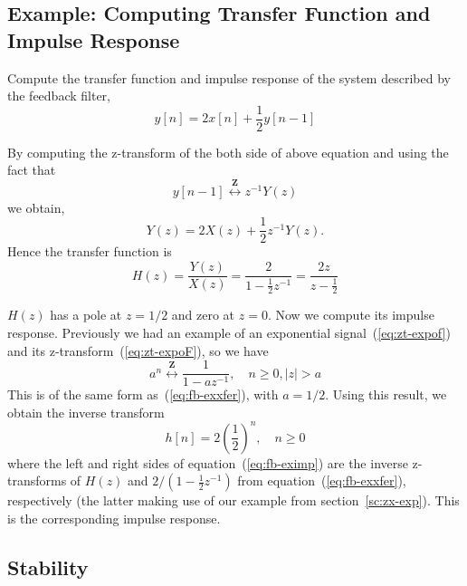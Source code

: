 \subsection{Example: Computing Transfer Function and Impulse Response}

Compute the transfer function and impulse response of the system
described by the feedback filter, 
\begin{equation}
y[n] = 2x[n] + \frac{1}{2}y[n-1]
\end{equation}

By computing the z-transform of the both side of above equation and
using the fact that
\begin{equation}
y[n-1]\stackrel{\mathbf{Z}}{\longleftrightarrow} z^{-1}Y(z)
\end{equation}
we obtain,
\begin{equation}
Y(z)= 2X(z) + \frac{1}{2}z^{-1}Y(z).
\end{equation}
Hence the transfer function is 
\begin{equation}
H(z)= \frac{Y(z)}{X(z)} = \frac{2}{1-\frac{1}{2}z^{-1}}
    = \frac{2z}{z-\frac{1}{2}} \label{eq:fb-exxfer}
\end{equation}

$H(z)$ has a pole at $z=1/2$ and zero at $z=0$. Now we
compute its impulse response. Previously we had an example of an
exponential signal~(\ref{eq:zt-expof}) and its
z-transform~(\ref{eq:zt-expoF}), so we have
\begin{equation}
a^n\stackrel{\mathbf{Z}}{\longleftrightarrow}
\frac{1}{1-az^{-1}}, \quad n \ge 0, |z|>a
\end{equation}
This is of the same form as~(\ref{eq:fb-exxfer}), with $a=1/2$.  Using
this result, we obtain the inverse transform
\begin{equation}
h[n] = 2\left(\frac{1}{2}\right)^n, \quad n\ge 0 \label{eq:fb-eximp}
\end{equation}
where the left and right sides of equation~(\ref{eq:fb-eximp}) are the
inverse z-transforms of $H(z)$ and $2/(1-\frac{1}{2}z^{-1})$
from equation~(\ref{eq:fb-exxfer}), respectively (the latter making
use of our example from section~\ref{sc:zx-exp}).  This is the
corresponding impulse response.

\subsection{Stability}

